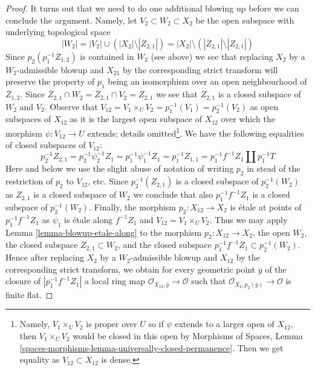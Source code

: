 \documentclass{stacks-project}
\theoremstyle{plain}
\theoremstyle{definition}
\theoremstyle{remark}
\numberwithin{equation}{subsection}
\begin{document}
\begin{proof}
\medskip\noindent
It turns out that we need to do one additional blowing up before we
can conclude the argument. Namely, let $V_2 \subset W_2 \subset X_2$
be the open subspace with underlying topological space
$$
|W_2| =
|V_2| \cup (|X_2| \setminus |\overline{Z}_{2, 1}|) =
|X_2| \setminus \left(|\overline{Z}_{2, 1}| \setminus |Z_{2, 1}|\right)
$$
Since $p_2(p_1^{-1}\overline{Z}_{1, 2})$ is contained in $W_2$ (see above)
we see that replacing $X_2$ by a $W_2$-admissible blowup and $X_{21}$
by the corresponding strict transform will preserve the property of
$p_1$ being an isomorphism over an open neighbourhood of $\overline{Z}_{1, 2}$.
Since $\overline{Z}_{2, 1} \cap W_2 = \overline{Z}_{2, 1} \cap V_2 = Z_{2, 1}$
we see that $Z_{2, 1}$ is a closed subspace of $W_2$ and $V_2$.
Observe that $V_{12} = V_1 \times_U V_2 = p_1^{-1}(V_1) = p_2^{-1}(V_2)$
as open subspaces of $X_{12}$ as it is the largest open subspace of $X_{12}$
over which the morphism $\psi : V_{12} \to U$ extends; details
omitted\footnote{Namely, $V_1 \times_U V_2$ is proper over $U$ so if
$\psi$ extends to a larger open of $X_{12}$, then $V_1 \times_U V_2$
would be closed in this open by Morphisms of Spaces, Lemma
\ref{spaces-morphisms-lemma-universally-closed-permanence}.
Then we get equality as $V_{12} \subset X_{12}$ is dense.}.
We have the following equalities of closed subspaces of $V_{12}$:
$$
p_2^{-1}Z_{2, 1} = p_2^{-1} \psi_2^{-1} Z_1 =
p_1^{-1} \psi_1^{-1} Z_1= p_1^{-1}Z_{1, 1} =
p_1^{-1}f^{-1}Z_1 \amalg p_1^{-1}T
$$
Here and below we use the slight abuse of notation of writing $p_2$ in
stead of the restriction of $p_2$ to $V_{12}$, etc.
Since $p_2^{-1}(Z_{2, 1})$ is a closed subspace of $p_2^{-1}(W_2)$
as $Z_{2, 1}$ is a closed subspace of $W_2$ we conclude that also
$p_1^{-1}f^{-1}Z_1$ is a closed subspace of $p_2^{-1}(W_2)$.
Finally, the morphism $p_2 : X_{12} \to X_2$ is \'etale at points of
$p_1^{-1}f^{-1}Z_1$ as $\psi_1$ is \'etale along $f^{-1}Z_1$
and $V_{12} = V_1 \times_U V_2$.
Thus we may apply Lemma \ref{lemma-blowup-etale-along} to the morphism
$p_2 : X_{12} \to X_2$, the open $W_2$, the closed subspace
$Z_{2, 1} \subset W_2$, and the closed subspace
$p_1^{-1}f^{-1}Z_1 \subset p_2^{-1}(W_2)$.
Hence after replacing $X_2$ by a $W_2$-admissible blowup and $X_{12}$ by
the corresponding strict transform, we obtain for every geometric
point $\overline{y}$ of the closure of $|p_1^{-1}f^{-1}Z_1|$ a local ring map
$\mathcal{O}_{X_{12}, \overline{y}} \to \mathcal{O}$ such that
$\mathcal{O}_{X_2, p_2(\overline{y})} \to \mathcal{O}$ is finite flat.


\end{proof}
\end{document}
